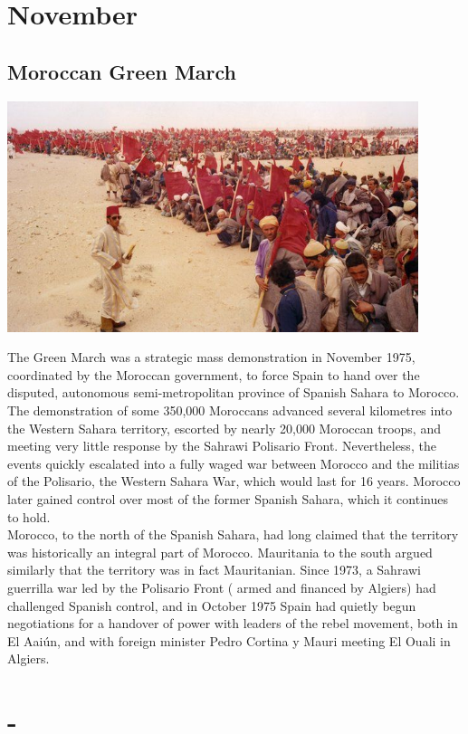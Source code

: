 \documentclass[11pt]{report}
\begin{document}
\section{November}
\subsection{Moroccan Green March}
\vspace{2mm}\begin{center}\includegraphics[width=12cm]{./img/greenmarch.jpg}\end{center}
The Green March was a strategic mass demonstration in November 1975, coordinated by the Moroccan government, to force Spain to hand over the disputed, autonomous semi-metropolitan province of Spanish Sahara to Morocco. The demonstration of some 350,000 Moroccans advanced several kilometres into the Western Sahara territory, escorted by nearly 20,000 Moroccan troops, and meeting very little response by the Sahrawi Polisario Front. Nevertheless, the events quickly escalated into a fully waged war between Morocco and the militias of the Polisario, the Western Sahara War, which would last for 16 years. Morocco later gained control over most of the former Spanish Sahara, which it continues to hold.\\ \indent Morocco, to the north of the Spanish Sahara, had long claimed that the territory was historically an integral part of Morocco. Mauritania to the south argued similarly that the territory was in fact Mauritanian. Since 1973, a Sahrawi guerrilla war led by the Polisario Front ( armed and financed by Algiers) had challenged Spanish control, and in October 1975 Spain had quietly begun negotiations for a handover of power with leaders of the rebel movement, both in El Aaiún, and with foreign minister Pedro Cortina y Mauri meeting El Ouali in Algiers.
\section{-}
\end{document}
